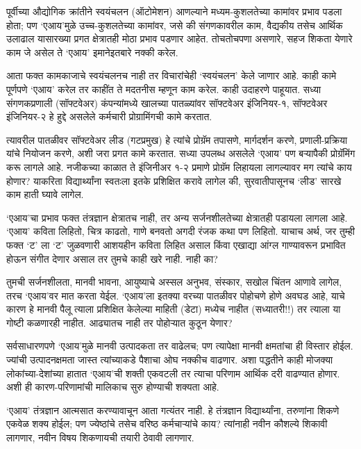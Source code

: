 पूर्वीच्या औद्योगिक क्रांतीने स्वयंचलन (ऑटोमेशन) आणल्याने मध्यम-कुशलतेच्या कामांवर प्रभाव पडला होता; पण ‘एआय’मुळे उच्च-कुशलतेच्या कामांवर, जसे की संगणकावरील काम, वैद्यकीय तसेच आर्थिक उलाढाल यासारख्या प्रगत क्षेत्रातही मोठा प्रभाव पडणार आहेत. तोचतोचपणा असणारे, सहज शिकता येणारे काम जे असेल ते ‘एआय’ इमानेइतबारे नक्की करेल.

आता फक्त कामकाजाचे स्वयंचलनच नाही तर विचारांचेही ‘स्वयंचलन’ केले जाणार आहे. काही कामे पूर्णपणे ‘एआय’ करेल तर काहींत ते मदतनीस म्हणून काम करेल. काही उदाहरणे पाहूयात. सध्या संगणकप्रणाली (सॉफ्टवेअर) कंपन्यांमध्ये खालच्या पातळ्यांवर सॉफ्टवेअर इंजिनियर-१, सॉफ्टवेअर इंजिनियर-२ हे हुद्दे असलेले कर्मचारी प्रोग्रामिंगची कामे करतात.

त्यावरील पातळीवर सॉफ्टवेअर लीड (गटप्रमुख) हे त्यांचे प्रोग्रॅम तपासणे, मार्गदर्शन करणे, प्रणाली-प्रक्रिया यांचे नियोजन करणे, अशी जरा प्रगत कामे करतात. सध्या उपलब्ध असलेले ‘एआय’ पण बऱ्यापैकी प्रोग्रॅमिंग करू लागले आहे. नजीकच्या काळात ते इंजिनीअर १-२ प्रमाणे प्रोग्रॅम लिहायला लागल्यावर मग त्यांचे काय होणार? याकरिता विद्यार्थ्यांना स्वतःला इतके प्रशिक्षित करावे लागेल की, सुरवातीपासूनच ‘लीड’ सारखे काम हाती घ्यावे लागेल.

‘एआय’चा प्रभाव फक्त तंत्रज्ञान क्षेत्रातच नाही, तर अन्य सर्जनशीलतेच्या क्षेत्रातही पडायला लागला आहे. ‘एआय’ कविता लिहितो, चित्र काढतो, गाणे बनवतो अगदी रंजक कथा पण लिहितो. याचाच अर्थ, जर तुम्ही फक्त ‘ट’ ला ‘ट’ जुळवणारी आशयहीन कविता लिहित असाल किंवा एखाद्या आंग्ल गाण्यावरून प्रभावित होऊन संगीत देणार असाल तर तुमचे काही खरे नाही. नाही का?

तुमची सर्जनशीलता, मानवी भावना, आयुष्याचे अस्सल अनुभव, संस्कार, सखोल चिंतन आणावे लागेल, तरच ‘एआय’वर मात करता येईल. ‘एआय’ला इतक्या वरच्या पातळीवर पोहोचणे होणे अवघड आहे, याचे कारण हे मानवी पैलू त्याला प्रशिक्षित केलेल्या माहिती (डेटा) मध्येच नाहीत (सध्यातरी!!) तर त्याला या गोष्टी कळणारही नाहीत. आढ्यातच नाही तर पोहोऱ्यात कुठून येणार?

सर्वसाधारणपणे ‘एआय’मुळे मानवी उत्पादकता तर वाढेलच; पण त्यापेक्षा मानवी क्षमतांचा ही विस्तार होईल. ज्यांची उत्पादनक्षमता जास्त त्यांच्याकडे पैशाचा ओघ नक्कीच वाढणार. अशा पद्धतीने काही मोजक्या लोकांच्या-देशांच्या हातात ‘एआय’ची शक्ती एकवटली तर त्याचा परिणाम आर्थिक दरी वाढण्यात होणार. अशी ही कारण-परिणामांची मालिकाच सुरु होण्याची शक्यता आहे.

‘एआय’ तंत्रज्ञान आत्मसात करण्यावाचून आता गत्यंतर नाही. हे तंत्रज्ञान विद्यार्थ्यांना, तरुणांना शिकणे एकवेळ शक्य होईल; पण ज्येष्ठांचे तसेच वरिष्ठ कर्मचाऱ्यांचे काय? त्यांनाही नवीन कौशल्ये शिकावी लागणार, नवीन विषय शिकणायची तयारी ठेवावी लागणार.

